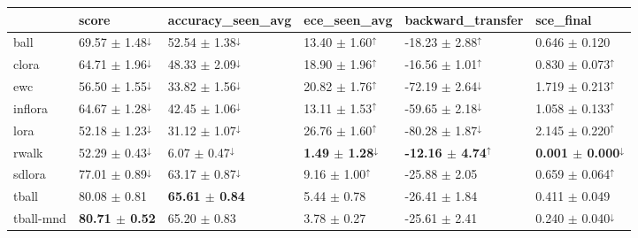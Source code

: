 \begin{tabular}{llllll}
\toprule
 & {\small score} & {\small accuracy\_seen\_avg} & {\small ece\_seen\_avg} & {\small backward\_transfer} & {\small sce\_final} \\
\midrule
ball & \small 69.57 $\pm$ 1.48$^{\downarrow}$ & \small 52.54 $\pm$ 1.38$^{\downarrow}$ & \small 13.40 $\pm$ 1.60$^{\uparrow}$ & \small -18.23 $\pm$ 2.88$^{\uparrow}$ & \small 0.646 $\pm$ 0.120 \\
clora & \small 64.71 $\pm$ 1.96$^{\downarrow}$ & \small 48.33 $\pm$ 2.09$^{\downarrow}$ & \small 18.90 $\pm$ 1.96$^{\uparrow}$ & \small -16.56 $\pm$ 1.01$^{\uparrow}$ & \small 0.830 $\pm$ 0.073$^{\uparrow}$ \\
ewc & \small 56.50 $\pm$ 1.55$^{\downarrow}$ & \small 33.82 $\pm$ 1.56$^{\downarrow}$ & \small 20.82 $\pm$ 1.76$^{\uparrow}$ & \small -72.19 $\pm$ 2.64$^{\downarrow}$ & \small 1.719 $\pm$ 0.213$^{\uparrow}$ \\
inflora & \small 64.67 $\pm$ 1.28$^{\downarrow}$ & \small 42.45 $\pm$ 1.06$^{\downarrow}$ & \small 13.11 $\pm$ 1.53$^{\uparrow}$ & \small -59.65 $\pm$ 2.18$^{\downarrow}$ & \small 1.058 $\pm$ 0.133$^{\uparrow}$ \\
lora & \small 52.18 $\pm$ 1.23$^{\downarrow}$ & \small 31.12 $\pm$ 1.07$^{\downarrow}$ & \small 26.76 $\pm$ 1.60$^{\uparrow}$ & \small -80.28 $\pm$ 1.87$^{\downarrow}$ & \small 2.145 $\pm$ 0.220$^{\uparrow}$ \\
rwalk & \small 52.29 $\pm$ 0.43$^{\downarrow}$ & \small 6.07 $\pm$ 0.47$^{\downarrow}$ & \small \textbf{1.49 $\pm$ 1.28}$^{\downarrow}$ & \small \textbf{-12.16 $\pm$ 4.74}$^{\uparrow}$ & \small \textbf{0.001 $\pm$ 0.000}$^{\downarrow}$ \\
sdlora & \small 77.01 $\pm$ 0.89$^{\downarrow}$ & \small 63.17 $\pm$ 0.87$^{\downarrow}$ & \small 9.16 $\pm$ 1.00$^{\uparrow}$ & \small -25.88 $\pm$ 2.05 & \small 0.659 $\pm$ 0.064$^{\uparrow}$ \\
tball & \small 80.08 $\pm$ 0.81 & \small \textbf{65.61 $\pm$ 0.84} & \small 5.44 $\pm$ 0.78 & \small -26.41 $\pm$ 1.84 & \small 0.411 $\pm$ 0.049 \\
tball-mnd & \small \textbf{80.71 $\pm$ 0.52} & \small 65.20 $\pm$ 0.83 & \small 3.78 $\pm$ 0.27 & \small -25.61 $\pm$ 2.41 & \small 0.240 $\pm$ 0.040$^{\downarrow}$ \\
\bottomrule
\end{tabular}
